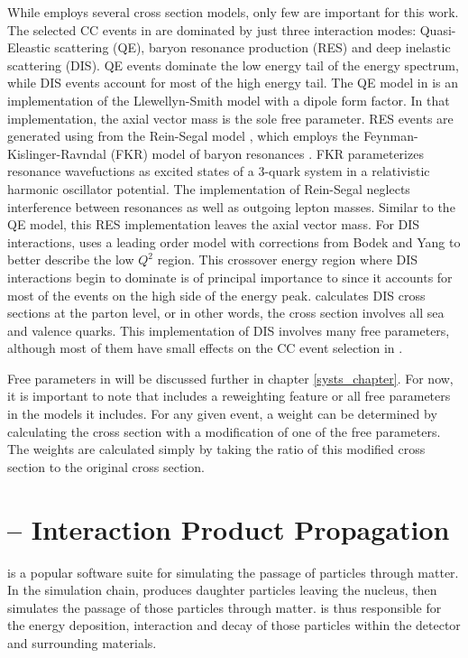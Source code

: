 While \genie employs several cross section models, only few are important for this work.  The selected \numu CC events in \nova are dominated by just three interaction modes: Quasi-Eleastic scattering (QE),  baryon resonance production (RES) and deep inelastic scattering (DIS).  QE events dominate the low energy tail of the energy spectrum, while DIS events account for most of the high energy tail.  The QE model in \genie is an implementation of the Llewellyn-Smith model \cite{LlewellynSmith} with a dipole form factor.  In that implementation, the axial vector mass is the sole free parameter.  RES events are generated using from the Rein-Segal model \cite{rein1981neutrino}, which employs the Feynman-Kislinger-Ravndal (FKR) model of baryon resonances \cite{feynman1971current}.  FKR parameterizes resonance wavefuctions as excited states of a 3-quark system in a relativistic harmonic oscillator potential.  The \genie implementation of Rein-Segal neglects interference between resonances as well as outgoing lepton masses.  Similar to the QE model, this RES implementation leaves the axial vector mass.  For DIS interactions, \genie uses a leading order model with corrections from Bodek and Yang \cite{bodek2003higher} to better describe the low $Q^2$ region.  This crossover energy region where DIS interactions begin to dominate is of principal importance to \nova since it accounts for most of the events on the high side of the energy peak.  \genie calculates DIS cross sections at the parton level, or in other words, the cross section involves all sea and valence quarks.  This implementation of DIS involves many free parameters, although most of them have small effects on the \numu CC event selection in \nova.

Free parameters in \genie will be discussed further in chapter \ref{systs_chapter}.  For now, it is important to note that \genie includes a reweighting feature or all free parameters in the models it includes.  For any given event, a weight can be determined by calculating the cross section with a modification of one of the free parameters.  The weights are calculated simply by taking the ratio of this modified cross section to the original cross section.


\section{\geant -- Interaction Product Propagation}

\geant is a popular software suite for simulating the passage of particles through matter.  In the \nova simulation chain, \genie produces daughter particles leaving the nucleus, then \geant simulates the passage of those particles through matter.  \geant is thus responsible for the energy deposition, interaction and decay of those particles within the detector and surrounding materials.

